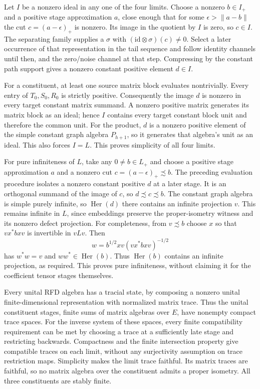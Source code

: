 \documentclass[11pt,letterpaper]{amsart}
\theoremstyle{remark}\newtheorem{remark}[theorem]{Remark}
\newcommand{\Her}{\operatorname{Her}}\newcommand{\id}{\mathrm{id}}
\begin{document}
Let $I$ be a nonzero ideal in any one of the four limits. Choose a
nonzero $b\in I_+$ and a positive stage approximation $a$, close enough
that for some $\epsilon>\|a-b\|$ the cut
$c=(a-\epsilon)_+$ is nonzero. Its image in the quotient by $I$ is zero,
so $c\in I$. The separating family supplies a $\sigma$ with
$(\id\otimes\sigma)(c)\ne0$. Select a later occurrence of that
representation in the tail sequence and follow identity channels until
then, and the zero/noise channel at that step. Compressing by the
constant path support gives a nonzero constant positive element $d\in I$.

For a constituent, at least one source matrix block evaluates nontrivially.
Every entry of $T_0,S_0,R_0$ is strictly positive. Consequently the
image $d$ is nonzero in every target constant matrix summand. A nonzero
positive matrix generates its matrix block as an ideal; hence $I$
contains every target constant block unit and therefore the common unit.
For the product, $d$ is a nonzero positive element of the simple constant
graph algebra $P_{h+1}$, so it generates that algebra's unit as an ideal.
This also forces $I=L$. This proves simplicity of all four limits.

For pure infiniteness of $L$, take any $0\ne b\in L_+$ and choose a
positive stage approximation $a$ and a nonzero cut
$c=(a-\epsilon)_+\precsim b$. The preceding evaluation procedure isolates
a nonzero constant positive $d$ at a later stage. It is an orthogonal
summand of the image of $c$, so $d\precsim c\precsim b$. The constant
graph algebra is simple purely infinite, so $\Her(d)$ there contains an
infinite projection $v$. This remains infinite in $L$, since embeddings
preserve the proper-isometry witness and its nonzero defect projection.
For completeness, from $v\precsim b$ choose $x$ so that $vx^*bxv$ is
invertible in $vLv$. Then
\[
         w=b^{1/2}xv(vx^*bxv)^{-1/2}
\]
has $w^*w=v$ and $ww^*\in\Her(b)$. Thus $\Her(b)$ contains an infinite
projection, as required. This proves pure infiniteness, without claiming
it for the coefficient tensor stages themselves.

Every unital RFD algebra has a tracial state, by composing a nonzero
unital finite-dimensional representation with normalized matrix trace.
Thus the unital constituent stages, finite sums of matrix algebras over
$E$, have nonempty compact trace spaces. For the inverse system of these
spaces, every finite compatibility requirement can be met by choosing a
trace at a sufficiently late stage and restricting backwards. Compactness
and the finite intersection property give compatible traces on each
limit, without any surjectivity assumption on trace restriction maps.
Simplicity makes the limit trace faithful. Its matrix traces are faithful,
so no matrix algebra over the constituent admits a proper isometry.
All three constituents are stably finite.
\end{document}
